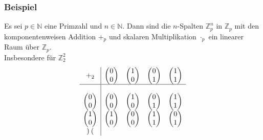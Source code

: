 \subsubsection{Beispiel}
Es sei $p\in\mathbb{N}$ eine Primzahl und $n\in\mathbb{N}$.  Dann sind die $n$-Spalten $\mathbb{Z}_p^n$ in $\mathbb{Z}_p$ mit den komponentenweisen Addition $+_p$ und skalaren Multiplikation $\cdot_p$ ein linearer Raum über $\mathbb{Z}_p$.\\
Insbesondere für $\mathbb{Z}_2^2$
\[\begin{array}{c|cccc}+_2 & \begin{pmatrix}0\\ 0\end{pmatrix} & \begin{pmatrix} 1 \\ 0 \end{pmatrix} & \begin{pmatrix}0 \\ 1\end{pmatrix} & \begin{pmatrix}1\\ 1\end{pmatrix} \\ \hline \\ \begin{pmatrix}
0\\ 0\end{pmatrix} &\begin{pmatrix}0 \\ 0\end{pmatrix} &\begin{pmatrix}1\\ 0\end{pmatrix} &\begin{pmatrix}0\\ 1\end{pmatrix} & \begin{pmatrix}1\\ 1\end{pmatrix} \\ \begin{pmatrix}
1\\ 0\end{pmatrix} &\begin{pmatrix}1 \\ 0\end{pmatrix} &\begin{pmatrix}0\\ 0\end{pmatrix} &\begin{pmatrix}1\\ 1\end{pmatrix} & \begin{pmatrix}0\\ 1\end{pmatrix} \\ \begin{pmatrix}

\end{pmatrix}
\end{array}\]
